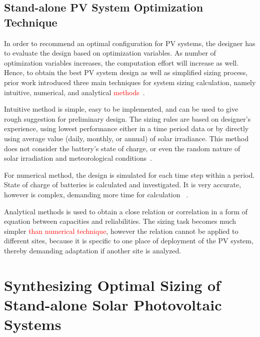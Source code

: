 \documentclass[review]{elsarticle}
\begin{document}
\subsection{Stand-alone PV System Optimization Technique}
In order to recommend an optimal configuration for PV systems, the designer has to evaluate the design based on optimization variables. As number of optimization variables increases, the computation effort will increase as well. Hence, to obtain the best PV system design as well as simplified sizing process, prior work introduced three main techniques for system sizing calculation, namely intuitive, numerical, and analytical \textcolor{red}{methods~\cite{Zhou2010}}.

Intuitive method is simple, easy to be implemented, and can be used to give rough suggestion for preliminary design. The sizing rules are based on designer's experience, using lowest performance either in a time period data or by directly using average value (daily, monthly, or annual) of solar irradiance. This method does not consider the battery's state of charge, or even the random nature of solar irradiation and meteorological conditions~\cite{Alsadi2018}.

For numerical method, the design is simulated for each time step within a period. State of charge of batteries is calculated and investigated. It is very accurate, however is complex, demanding more time for calculation \textcolor{red}{~\cite{Park2004}}.

Analytical methods is used to obtain a close relation or correlation in a form of equation between capacities and reliabilities. The sizing task becomes much simpler \textcolor{red}{than numerical technique}, however the relation cannot be applied to different sites, because it is specific to one place of deployment of the PV system, thereby demanding adaptation if another site is analyzed.

\section{Synthesizing Optimal Sizing of Stand-alone Solar Photovoltaic Systems}
\label{sec:Method}
\end{document}
